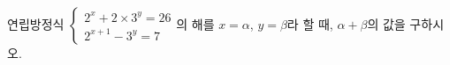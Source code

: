 연립방정식 $\begin{cases} 2^x+2\times 3^y=26 \\ 2^{x+1}-3^y=7 \end{cases}$의 해를 $x=\alpha$, $y=\beta$라 할 때, $\alpha+\beta$의 값을 구하시오.

